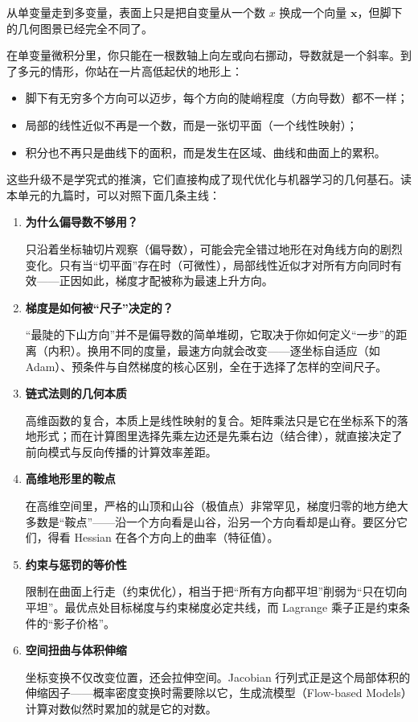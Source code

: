 从单变量走到多变量，表面上只是把自变量从一个数 \(x\) 换成一个向量 \(\mathbf x\)，但脚下的几何图景已经完全不同了。

在单变量微积分里，你只能在一根数轴上向左或向右挪动，导数就是一个斜率。到了多元的情形，你站在一片高低起伏的地形上：
\begin{itemize}
    \item 脚下有无穷多个方向可以迈步，每个方向的陡峭程度（方向导数）都不一样；
    \item 局部的线性近似不再是一个数，而是一张切平面（一个线性映射）；
    \item 积分也不再只是曲线下的面积，而是发生在区域、曲线和曲面上的累积。
\end{itemize}

这些升级不是学究式的推演，它们直接构成了现代优化与机器学习的几何基石。读本单元的九篇时，可以对照下面几条主线：

\begin{enumerate}
    \item \textbf{为什么偏导数不够用？}\par
    只沿着坐标轴切片观察（偏导数），可能会完全错过地形在对角线方向的剧烈变化。只有当``切平面''存在时（可微性），局部线性近似才对所有方向同时有效——正因如此，梯度才配被称为最速上升方向。

    \item \textbf{梯度是如何被``尺子''决定的？}\par
    ``最陡的下山方向''并不是偏导数的简单堆砌，它取决于你如何定义``一步''的距离（内积）。换用不同的度量，最速方向就会改变——逐坐标自适应（如 Adam）、预条件与自然梯度的核心区别，全在于选择了怎样的空间尺子。

    \item \textbf{链式法则的几何本质}\par
    高维函数的复合，本质上是线性映射的复合。矩阵乘法只是它在坐标系下的落地形式；而在计算图里选择先乘左边还是先乘右边（结合律），就直接决定了前向模式与反向传播的计算效率差距。

    \item \textbf{高维地形里的鞍点}\par
    在高维空间里，严格的山顶和山谷（极值点）非常罕见，梯度归零的地方绝大多数是``鞍点''——沿一个方向看是山谷，沿另一个方向看却是山脊。要区分它们，得看 Hessian 在各个方向上的曲率（特征值）。

    \item \textbf{约束与惩罚的等价性}\par
    限制在曲面上行走（约束优化），相当于把``所有方向都平坦''削弱为``只在切向平坦''。最优点处目标梯度与约束梯度必定共线，而 Lagrange 乘子正是约束条件的``影子价格''。

    \item \textbf{空间扭曲与体积伸缩}\par
    坐标变换不仅改变位置，还会拉伸空间。Jacobian 行列式正是这个局部体积的伸缩因子——概率密度变换时需要除以它，生成流模型（Flow-based Models）计算对数似然时累加的就是它的对数。
\end{enumerate}

